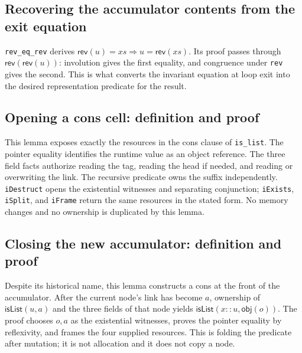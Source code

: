 \documentclass[11pt]{article}
\begin{document}
\subsection{Recovering the accumulator contents from the exit equation}

\begin{minipage}{\linewidth}

\end{minipage}

\texttt{rev\_eq\_rev} derives
\(\mathsf{rev}(u)=xs\Rightarrow u=\mathsf{rev}(xs)\).
Its proof passes through \(\mathsf{rev}(\mathsf{rev}(u))\): involution gives the
first equality, and congruence under \texttt{rev} gives the second. This is what
converts the invariant equation at loop exit into the desired representation
predicate for the result.

\subsection{Opening a cons cell: definition and proof}

\begin{minipage}{\linewidth}

\end{minipage}

This lemma exposes exactly the resources in the cons clause of
\texttt{is\_list}. The pointer equality identifies the runtime value as an
object reference. The three field facts authorize reading the tag, reading the
head if needed, and reading or overwriting the link. The recursive predicate
owns the suffix independently. \texttt{iDestruct} opens the existential
witnesses and separating conjunction; \texttt{iExists}, \texttt{iSplit}, and
\texttt{iFrame} return the same resources in the stated form. No memory changes
and no ownership is duplicated by this lemma.

\subsection{Closing the new accumulator: definition and proof}

\begin{minipage}{\linewidth}

\end{minipage}

Despite its historical name, this lemma constructs a cons at the front of the
accumulator. After the current node's link has become \(a\), ownership of
\(\mathsf{isList}(u,a)\) and the three fields of that node yields
\(\mathsf{isList}(x::u,\mathsf{obj}(o))\). The proof chooses \(o,a\) as the
existential witnesses, proves the pointer equality by reflexivity, and frames
the four supplied resources. This is folding the predicate after mutation;
it is not allocation and it does not copy a node.
\end{document}

